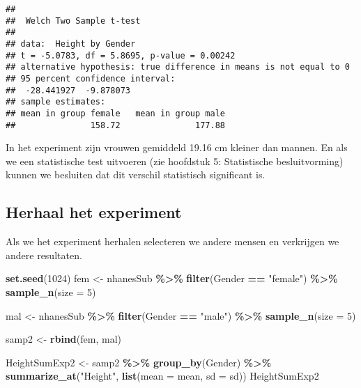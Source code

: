 \documentclass[
  12pt,dutch,coursenotes]{book}
\newenvironment{Shaded}{\begin{snugshade}}{\end{snugshade}}
\newcommand{\DataTypeTok}[1]{\textcolor[rgb]{0.13,0.29,0.53}{#1}}
\newcommand{\DecValTok}[1]{\textcolor[rgb]{0.00,0.00,0.81}{#1}}
\newcommand{\KeywordTok}[1]{\textcolor[rgb]{0.13,0.29,0.53}{\textbf{#1}}}
\newcommand{\NormalTok}[1]{#1}
\newcommand{\OperatorTok}[1]{\textcolor[rgb]{0.81,0.36,0.00}{\textbf{#1}}}
\newcommand{\StringTok}[1]{\textcolor[rgb]{0.31,0.60,0.02}{#1}}
\theoremstyle{definition}
\theoremstyle{definition}
\theoremstyle{definition}
\theoremstyle{remark}
\begin{document}
\begin{verbatim}
## 
## 	Welch Two Sample t-test
## 
## data:  Height by Gender
## t = -5.0783, df = 5.8695, p-value = 0.00242
## alternative hypothesis: true difference in means is not equal to 0
## 95 percent confidence interval:
##  -28.441927  -9.878073
## sample estimates:
## mean in group female   mean in group male 
##               158.72               177.88
\end{verbatim}

In het experiment zijn vrouwen gemiddeld 19.16 cm kleiner dan mannen. En als we een statistische test uitvoeren (zie hoofdstuk 5: Statistische besluitvorming) kunnen we besluiten dat dit verschil statistisch significant is.

\hypertarget{herhaal-het-experiment}{%
\subsection{Herhaal het experiment}\label{herhaal-het-experiment}}

Als we het experiment herhalen selecteren we andere mensen en verkrijgen we andere resultaten.

\begin{Shaded}
\begin{Highlighting}[]
\KeywordTok{set.seed}\NormalTok{(}\DecValTok{1024}\NormalTok{)}
\NormalTok{fem \textless{}{-}}\StringTok{ }\NormalTok{nhanesSub }\OperatorTok{\%\textgreater{}\%}\StringTok{ }\KeywordTok{filter}\NormalTok{(Gender }\OperatorTok{==}\StringTok{ "female"}\NormalTok{) }\OperatorTok{\%\textgreater{}\%}\StringTok{ }
\StringTok{    }\KeywordTok{sample\_n}\NormalTok{(}\DataTypeTok{size =} \DecValTok{5}\NormalTok{)}

\NormalTok{mal \textless{}{-}}\StringTok{ }\NormalTok{nhanesSub }\OperatorTok{\%\textgreater{}\%}\StringTok{ }\KeywordTok{filter}\NormalTok{(Gender }\OperatorTok{==}\StringTok{ "male"}\NormalTok{) }\OperatorTok{\%\textgreater{}\%}\StringTok{ }\KeywordTok{sample\_n}\NormalTok{(}\DataTypeTok{size =} \DecValTok{5}\NormalTok{)}

\NormalTok{samp2 \textless{}{-}}\StringTok{ }\KeywordTok{rbind}\NormalTok{(fem, mal)}

\NormalTok{HeightSumExp2 \textless{}{-}}\StringTok{ }\NormalTok{samp2 }\OperatorTok{\%\textgreater{}\%}\StringTok{ }\KeywordTok{group\_by}\NormalTok{(Gender) }\OperatorTok{\%\textgreater{}\%}\StringTok{ }\KeywordTok{summarize\_at}\NormalTok{(}\StringTok{"Height"}\NormalTok{, }
    \KeywordTok{list}\NormalTok{(}\DataTypeTok{mean =}\NormalTok{ mean, }\DataTypeTok{sd =}\NormalTok{ sd))}
\NormalTok{HeightSumExp2}
\end{Highlighting}
\end{Shaded}
\end{document}
